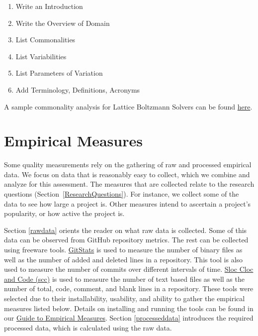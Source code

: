 \documentclass[letterpaper,cleveref]{lipics-v2019}
\theoremstyle{definition}
\begin{document}
\begin{enumerate}
\item Write an Introduction
\item Write the Overview of Domain
\item List Commonalities
\item List Variabilities
\item List Parameters of Variation
\item Add Terminology, Definitions, Acronyms
\end{enumerate}

A sample commonality analysis for Lattice Boltzmann Solvers can be found
\href{https://github.com/smiths/AIMSS/blob/master/StateOfPractice/Peter-Notes/Commonality-Analysis-LB-Systems.pdf}
{here}.

\section{Empirical Measures} \label{SecEmpiricalMeasures}

Some quality measurements rely on the gathering of raw and processed empirical
data. We focus on data that is reasonably easy to collect, which we combine and
analyze for this assessment. The measures that are collected relate to the
research questions (Section~\ref{ResearchQuestions}). For instance, we collect some of the
data to see how large a project is. Other measures intend to ascertain a
project’s popularity, or how active the project is.  

Section \ref{rawdata} orients the reader on what raw data is collected.  Some of this data can be observed from GitHub repository metrics. The rest can be collected using freeware tools. \href{https://github.com/tomgi/git_stats}{GitStats} is used to measure
the number of binary files as well as the number of added and deleted lines in a
repository. This tool is also used to measure the number of commits over
different intervals of time. \href{https://github.com/boyter/scc}{Sloc Cloc and
  Code (scc)} is used to measure the number of text based files as well as the
number of total, code, comment, and blank lines in a repository. These tools
were selected due to their installability, usability, and ability to gather the
empirical measures listed below. Details on installing and running the tools can
be found in our 
\href{https://github.com/smiths/AIMSS/blob/master/StateOfPractice/Methodology/A
  Guide to Empirical Measures.pdf} {Guide to Empirical Measures}. Section \ref{processeddata}
introduces the required processed data, which is calculated using the raw data.
\end{document}
